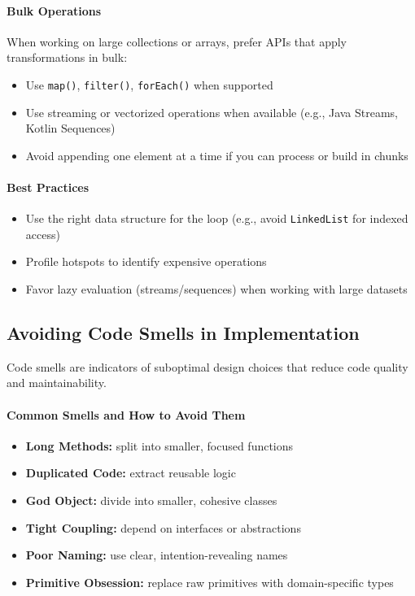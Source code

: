\documentclass[a4paper,12pt]{article}
\begin{document}
\paragraph{Bulk Operations}

When working on large collections or arrays, prefer APIs that apply transformations in bulk:

\begin{itemize}
  \item Use \texttt{map()}, \texttt{filter()}, \texttt{forEach()} when supported
  \item Use streaming or vectorized operations when available (e.g., Java Streams, Kotlin Sequences)
  \item Avoid appending one element at a time if you can process or build in chunks
\end{itemize}

\paragraph{Best Practices}

\begin{itemize}
  \item Use the right data structure for the loop (e.g., avoid \texttt{LinkedList} for indexed access)
  \item Profile hotspots to identify expensive operations
  \item Favor lazy evaluation (streams/sequences) when working with large datasets
\end{itemize}

\subsection{Avoiding Code Smells in Implementation}

Code smells are indicators of suboptimal design choices that reduce code quality and maintainability.

\paragraph{Common Smells and How to Avoid Them}

\begin{itemize}
  \item \textbf{Long Methods:} split into smaller, focused functions
  \item \textbf{Duplicated Code:} extract reusable logic
  \item \textbf{God Object:} divide into smaller, cohesive classes
  \item \textbf{Tight Coupling:} depend on interfaces or abstractions
  \item \textbf{Poor Naming:} use clear, intention-revealing names
  \item \textbf{Primitive Obsession:} replace raw primitives with domain-specific types
\end{itemize}
\end{document}
